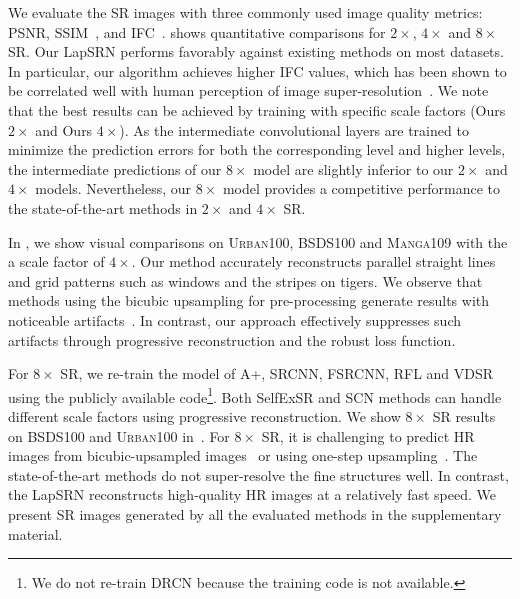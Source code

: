 \documentclass[10pt,twocolumn,letterpaper]{article}
\begin{document}
	
	We evaluate the SR images with three commonly used image quality metrics: PSNR, SSIM~\cite{SSIM}, and IFC~\cite{IFC}.
	 shows quantitative comparisons for $2\times$, $4\times$ and $8\times$ SR.
	Our LapSRN performs favorably against existing methods on most datasets.
	In particular, our algorithm achieves higher IFC values, which has been shown to be correlated well with human perception of image super-resolution~\cite{Yang-ECCV-2014}.
	We note that the best results can be achieved by training with 
	specific scale factors (Ours $2\times$ and Ours $4\times$).
	As the intermediate convolutional layers are trained to minimize the prediction errors for both the corresponding level and higher levels, 
	the intermediate predictions of our $8\times$ model are slightly inferior to our $2\times$ and $4\times$ models.
	Nevertheless, our $8\times$ model provides a competitive performance to the state-of-the-art methods in $2\times$ and $4\times$ SR.
	
	
	In , we show visual comparisons on \textsc{Urban100}, \textsc{BSDS100} and \textsc{Manga109} with the a scale factor of $4\times$.
	Our method accurately reconstructs parallel straight lines and grid patterns such as windows and the stripes on tigers.
	We observe that methods using the bicubic upsampling for pre-processing generate results with noticeable artifacts~\cite{SRCNN,VDSR,RFL,A+,SCN}.
	In contrast, our approach effectively suppresses such artifacts through progressive reconstruction and the robust loss function.
	
	
	
	For $8\times$ SR, we re-train the model of A+, SRCNN, FSRCNN, RFL and VDSR using the publicly available code\footnote{We do not re-train DRCN because the training code is not available.}.
	Both SelfExSR and SCN methods can handle different scale factors using progressive reconstruction.
	We show $8\times$ SR results on \textsc{BSDS100} and \textsc{Urban100} in~.
	For $8\times$ SR, it is challenging to predict HR images from bicubic-upsampled images~\cite{SRCNN,VDSR,A+} or using one-step upsampling~\cite{FSRCNN}.
	The state-of-the-art methods do not super-resolve the fine structures well.
	In contrast, the LapSRN reconstructs high-quality HR images at a relatively fast speed.
	We present SR images generated by all the evaluated methods in the supplementary material.
	
	
\end{document}
